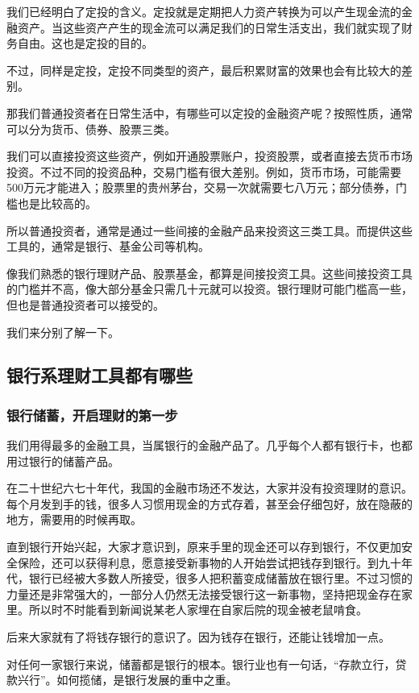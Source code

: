 \setcounter{figure}{0}\setcounter{table}{0}
我们已经明白了定投的含义。定投就是定期把人力资产转换为可以产生现金流的金融资产。当这些资产产生的现金流可以满足我们的日常生活支出，我们就实现了财务自由。这也是定投的目的。

不过，同样是定投，定投不同类型的资产，最后积累财富的效果也会有比较大的差别。

那我们普通投资者在日常生活中，有哪些可以定投的金融资产呢？按照性质，通常可以分为货币、债券、股票三类。

我们可以直接投资这些资产，例如开通股票账户，投资股票，或者直接去货币市场投资。不过不同的投资品种，交易门槛有很大差别。例如，货币市场，可能需要500万元才能进入；股票里的贵州茅台，交易一次就需要七八万元；部分债券，门槛也是比较高的。

所以普通投资者，通常是通过一些间接的金融产品来投资这三类工具。而提供这些工具的，通常是银行、基金公司等机构。

像我们熟悉的银行理财产品、股票基金，都算是间接投资工具。这些间接投资工具的门槛并不高，像大部分基金只需几十元就可以投资。银行理财可能门槛高一些，但也是普通投资者可以接受的。

我们来分别了解一下。

\subsection{银行系理财工具都有哪些}
\subsubsection{银行储蓄，开启理财的第一步}

我们用得最多的金融工具，当属银行的金融产品了。几乎每个人都有银行卡，也都用过银行的储蓄产品。

在二十世纪六七十年代，我国的金融市场还不发达，大家并没有投资理财的意识。每个月发到手的钱，很多人习惯用现金的方式存着，甚至会仔细包好，放在隐蔽的地方，需要用的时候再取。

直到银行开始兴起，大家才意识到，原来手里的现金还可以存到银行，不仅更加安全保险，还可以获得利息，愿意接受新事物的人开始尝试把钱存到银行。到九十年代，银行已经被大多数人所接受，很多人把积蓄变成储蓄放在银行里。不过习惯的力量还是非常强大的，一部分人仍然无法接受银行这一新事物，坚持把现金存在家里。所以时不时能看到新闻说某老人家埋在自家后院的现金被老鼠啃食。

后来大家就有了将钱存银行的意识了。因为钱存在银行，还能让钱增加一点。

对任何一家银行来说，储蓄都是银行的根本。银行业也有一句话，“存款立行，贷款兴行”。如何揽储，是银行发展的重中之重。


